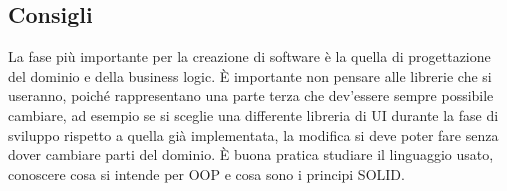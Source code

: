 \subsection{Consigli}
\noindent La fase più importante per la creazione di software è la quella di progettazione del dominio e della business logic. È importante non pensare alle librerie che si useranno, poiché rappresentano una parte terza che dev'essere sempre possibile cambiare, ad esempio se si sceglie una differente libreria di UI durante la fase di sviluppo rispetto a quella già implementata, la modifica si deve poter fare senza dover cambiare parti del dominio. È buona pratica studiare il linguaggio usato, conoscere cosa si intende per OOP e cosa sono i principi SOLID.